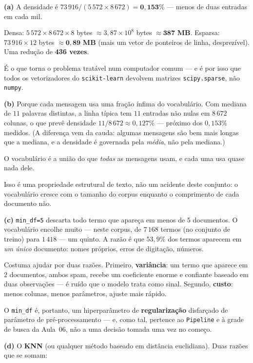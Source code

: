 \documentclass[11pt,a4paper]{article}
\begin{document}
\begin{solucao}
\textbf{(a)} A densidade é
$73\,916 / (5\,572 \times 8\,672) = \mathbf{0{,}153\%}$ --- menos de duas
entradas em cada mil.

Densa: $5\,572 \times 8\,672 \times 8$ bytes $\approx 3{,}87\times 10^{8}$ bytes
$\approx \mathbf{387}$ \textbf{MB}. Esparsa: $73\,916 \times 12$ bytes
$\approx \mathbf{0{,}89}$ \textbf{MB} (mais um vetor de ponteiros de linha,
desprezível). Uma redução de \textbf{436 vezes}.

É o que torna o problema tratável num computador comum --- e é por isso que todos
os vetorizadores do \texttt{scikit-learn} devolvem matrizes
\texttt{scipy.sparse}, não \texttt{numpy}.

\smallskip
\textbf{(b)} Porque cada mensagem usa uma fração ínfima do vocabulário. Com
mediana de $11$ palavras distintas, a linha típica tem $11$ entradas não nulas em
$8\,672$ colunas, o que prevê densidade $11/8\,672 \approx 0{,}127\%$ --- próximo
dos $0{,}153\%$ medidos. (A diferença vem da cauda: algumas mensagens são bem
mais longas que a mediana, e a densidade é governada pela \emph{média}, não pela
mediana.)

O vocabulário é a união do que \emph{todas} as mensagens usam, e cada uma usa
quase nada dele.

Isso é uma propriedade estrutural de texto, não um acidente deste conjunto: o
vocabulário cresce com o tamanho do corpus enquanto o comprimento de cada
documento não.

\smallskip
\textbf{(c)} \texttt{min\_df=5} descarta todo termo que apareça em menos de 5
documentos. O vocabulário encolhe muito --- neste corpus, de $7\,168$ termos (no
conjunto de treino) para $1\,418$ --- um quinto. A razão é que $53{,}9\%$ dos
termos aparecem em \emph{um único} documento: nomes próprios, erros de digitação,
números.

Costuma ajudar por duas razões. Primeiro, \textbf{variância}: um termo que
aparece em 2 documentos, ambos spam, recebe um coeficiente enorme e confiante
baseado em duas observações --- é ruído que o modelo trata como sinal. Segundo,
\textbf{custo}: menos colunas, menos parâmetros, ajuste mais rápido.

O \texttt{min\_df} é, portanto, um hiperparâmetro de \textbf{regularização}
disfarçado de parâmetro de pré-processamento --- e, como tal, pertence ao
\texttt{Pipeline} e à grade de busca da Aula~06, não a uma decisão tomada uma vez
no começo.

\smallskip
\textbf{(d)} O \textbf{KNN} (ou qualquer método baseado em distância euclidiana).
Duas razões que se somam:


\end{solucao}
\end{document}
